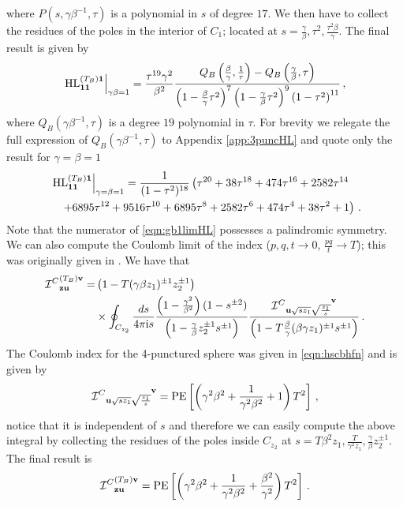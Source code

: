 \documentclass[main.tex]{subfiles}
\begin{document}
where $P(s,\gamma\beta^{-1},\tau)$ is a polynomial in $s$ of degree $17$. We then have to collect the residues of the poles in the interior of $C_1$; located at $s=\frac{\gamma}{\beta},\tau^2,\frac{\tau^2\beta}{\gamma}$. The final result is given by
\begin{equation}
\left.\textrm{HL}^{(T_B)\mathbf{1}}_{\mathbf{1}\mathbf{1}}\right|_{\gamma\beta=1}=\frac{\tau^{19}\gamma^2}{\beta^2}\frac{Q_B\left(\frac{\beta}{\gamma},\frac{1}{\tau}\right)-Q_B\left(\frac{\gamma}{\beta},\tau\right)}{\left(1-\frac{\beta}{\gamma}\tau^2\right)^{7}\left(1-\frac{\gamma}{\beta}\tau^2\right)^{9}\left(1-\tau^2\right)^{11}}\,,
\end{equation}
where $Q_B(\gamma\beta^{-1},\tau)$ is a degree $19$ polynomial in $\tau$. For brevity we relegate the full expression of $Q_B(\gamma\beta^{-1},\tau)$ to Appendix \ref{app:3puncHL} and quote only the result for $\gamma=\beta=1$
\begin{equation}
\begin{aligned}\label{eqn:gb1limHL}
&\left.\textrm{HL}^{(T_B)\mathbf{1}}_{\mathbf{1}\mathbf{1}}\right|_{\gamma=\beta=1}=\frac{1}{(1-\tau^2)^{18}}\left(\tau ^{20}+38 \tau ^{18}+474 \tau ^{16}+2582 \tau ^{14}\right.\\
&\quad\left.+6895 \tau ^{12}+9516 \tau ^{10}+6895 \tau ^8+2582 \tau ^6+474 \tau ^4+38 \tau ^2+1\right)\,.
\end{aligned}
\end{equation}
Note that the numerator of \eqref{eqn:gb1limHL} possesses a palindromic symmetry.
We can also compute the Coulomb limit of the index ($p,q,t\to0$, $\frac{pq}{t}\to T$); this was originally given in \cite{Razamat:2018zus}. We have that
\begin{equation}\label{eqn:TBindexCoulomb}
\begin{aligned}
 {\mathcal{I}^C}  ^{(T_B)\mathbf{v}}_{\mathbf{z}\mathbf{u}}=&\left(1-T(\gamma\beta z_1)^{\pm1}z_2^{\pm1}\right)\\
&\times\oint_{C_{z_2}}\frac{ds}{4\pi\iu s}\frac{\left(1-\frac{\gamma^2}{\beta^2}\right)(1-s^{\pm2})}{\left(1-\frac{\gamma}{\beta}z_2^{\pm1}s^{\pm1}\right)}\frac{ {\mathcal{I}^C}  \indices{_{\mathbf{u}\sqrt{sz_1}\sqrt{\frac{z_1}{s}}}^{\mathbf{v}}}}{\left(1-T\frac{\beta}{\gamma}(\beta\gamma z_1)^{\pm1}s^{\pm1}\right)}\,.
 \end{aligned}
\end{equation}
The Coulomb index for the 4-punctured sphere was given in \eqref{eqn:hscbhfn} and is given by
\begin{equation}
{\mathcal{I}^C}  \indices{_{\mathbf{u}\sqrt{sz_1}\sqrt{\frac{z_1}{s}}}^{\mathbf{v}}}=\PE\left[\left(\gamma^2\beta^2+\frac{1}{\gamma^2\beta^2}+1\right)T^2\right]\,,
\end{equation}
notice that it is independent of $s$ and therefore we can easily compute the above integral by collecting the residues of the poles inside $C_{z_2}$ at \newline$s=T\beta^2 z_1,\frac{T}{\gamma^2 z_1},\frac{\gamma}{\beta}z_2^{\pm1}$. The final result is
\begin{equation}
 {\mathcal{I}^C}  ^{(T_B)\mathbf{v}}_{\mathbf{z}\mathbf{u}}=\operatorname{\mathrm{PE}}\left[\left(\gamma^2\beta^2+\frac{1}{\gamma^2\beta^2}+\frac{\beta^2}{\gamma^2}\right)T^2\right]\,.
 \end{equation}
\end{document}
